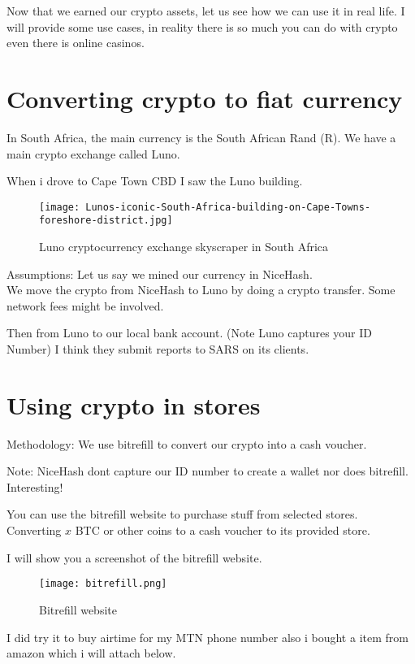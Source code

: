 Now that we earned our crypto assets, let us see how we can use it in real life. I will provide some use cases, in reality there is so much you can do with crypto even there is online casinos.

\section{Converting crypto to fiat currency}

In South Africa, the main currency is the South African Rand (R). We have a main crypto exchange called Luno.

When i drove to Cape Town CBD I saw the Luno building.

\begin{figure}[H]
\centering
\texttt{[image: Lunos-iconic-South-Africa-building-on-Cape-Towns-foreshore-district.jpg]}
\caption{Luno cryptocurrency exchange skyscraper in South Africa}
\label{fig:luno}
\end{figure}

Assumptions: Let us say we mined our currency in NiceHash. \\

We move the crypto from NiceHash to Luno by doing a crypto transfer. Some network fees might be involved.

Then from Luno to our local bank account. (Note Luno captures your ID Number) I think they submit reports to SARS on its clients.

\section{Using crypto in stores}

Methodology: We use bitrefill to convert our crypto into a cash voucher.

Note: NiceHash dont capture our ID number to create a wallet nor does bitrefill. Interesting!

You can use the bitrefill website to purchase stuff from selected stores. Converting $x$ BTC or other coins to a cash voucher to its provided store.

I will show you a screenshot of the bitrefill website.

\begin{figure}[H]
\centering
\texttt{[image: bitrefill.png]}
\caption{Bitrefill website}
\label{fig:bitrefill}
\end{figure}

I did try it to buy airtime for my MTN phone number also i bought a item from amazon which i will attach below.

